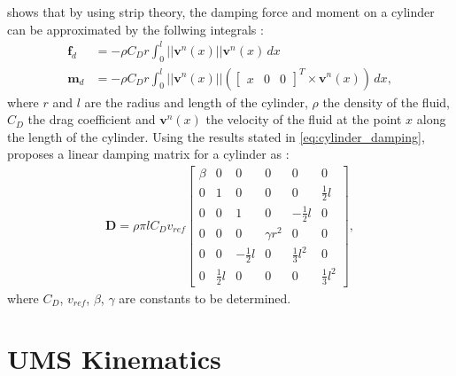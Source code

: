 \citeauthor{mcmillan1995} shows that by using strip theory, the damping force and
moment on a cylinder can be approximated by the follwing integrals \cite{mcmillan1995}:
\begin{subequations}
    \label{eq:cylinder_damping}
    \begin{align}
        \bm{f}_d &= - \rho C_D r \int_{0}^{l} ||\bm{v}^n(x)|| \bm{v}^n(x) \,dx \\
        \bm{m}_d &= - \rho C_D r \int_{0}^{l} ||\bm{v}^n(x)||
        \left(\begin{bmatrix}x & 0 & 0\end{bmatrix}^T \times \bm{v}^n(x)\right) \,dx,
    \end{align}
\end{subequations}
where $r$ and $l$ are the radius and length of the cylinder, $\rho$ the density
of the fluid, $C_D$ the drag coefficient and $\bm{v}^n(x)$ the velocity of the
fluid at the point $x$ along the length of the cylinder. Using the results stated
in \autoref{eq:cylinder_damping}, \citeauthor{schmidt2018} proposes a linear
damping matrix for a cylinder as \cite{schmidt2018}:
\begin{align}
    \bm{D} = \rho \pi l C_D v_{ref}
    \begin{bmatrix}
        \beta &            0 &             0 &          0 &              0 &            0 \\
            0 &            1 &             0 &          0 &              0 & \frac{1}{2}l \\
            0 &            0 &             1 &          0 &  -\frac{1}{2}l &            0 \\
            0 &            0 &             0 & \gamma r^2 &              0 &            0 \\
            0 &            0 & -\frac{1}{2}l &          0 & \frac{1}{3}l^2 &            0 \\
            0 & \frac{1}{2}l &             0 &          0 &              0 & \frac{1}{3}l^2
    \end{bmatrix},
\end{align}
where $C_D$, $v_{ref}$, $\beta$, $\gamma$ are constants to be determined.

\iffalse
\section{UMS Kinematics}


